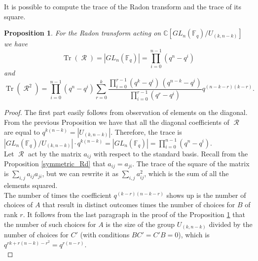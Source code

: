 \documentclass[12pt,reqno]{amsart}
\newtheorem{prop}[thm]{Proposition}
\theoremstyle{definition}
\theoremstyle{remark}
\numberwithin{equation}{section}
\newcommand{\CC}{\mathbb{C}}
\newcommand{\GL}[1]{GL_{#1}(\mathbb{F}_q)}
\DeclareMathOperator{\tr}{Tr}
\DeclareMathOperator{\R}{\mathcal{R}}
\begin{document}
It is possible to compute the trace of the Radon transform and the trace of its square.\\

\begin{prop}\label{trace_and_square}
    For the Radon transform acting on $\CC[\GL{n}/U_{(k,n-k)}]$ we have
    \[
    \tr (\R)=|\GL{n}|=\prod_{i=0}^{n-1}(q^n-q^i)
    \]
    and
    \[
    \tr(\R^2)=\prod_{i=0}^{n-1}(q^n-q^i) \sum_{r = 0}^{k}
\frac{\displaystyle\prod_{i=0}^{r-1} (q^k - q^i)\,(q^{n-k} - q^i)}
{\displaystyle\prod_{i=0}^{r-1} (q^r - q^i)} q^{(n-k-r)(k-r)}.
    \]
\end{prop}

\begin{proof}
The first part easily follows from observation of elements on the diagonal. From the previous Proposition we have that all the diagonal coefficients of $\R$ are equal to $q^{k(n-k)}=|U_{(k,n-k)}|$. Therefore, the trace is $|\GL{n} / U_{(k,n-k)}| \cdot q^{k(n-k)} = |\GL{n}| = \prod_{i=0}^{n-1}(q^n-q^i)$.\\


Let $\R$ act by the matrix $a_{ij}$ with respect to the standard basis. Recall from the Proposition \ref{symmetric_Rd} that $a_{ij}=a_{ji}$. The trace of the square of the matrix is $\sum_{i, j} a_{ij}a_{ji}$, but we can rewrite it as $\sum_{i, j} a_{ij}^2$, which is the sum of all the elements squared.\\

The number of times the coefficient $q^{(k-r)(n-k-r)}$ shows up is the number of choices of $A$ that result in distinct outcomes times the number of choices for $B$ of rank $r$. It follows from the last paragraph in the proof of the Proposition \ref{trace_and_square} that the number of such choices for $A$ is the size of the group $U_{(k,n-k)}$ divided by the number of choices for $C'$ (with conditions $BC'=C'B=0$), which is $q^{rk+r(n-k)-r^2}=q^{r(n-r)}$.\\



\end{proof}
\end{document}
